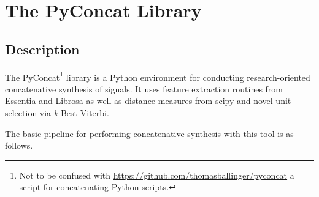 %	
%

\chapter{The PyConcat Library}
\label{app:pyconcat}

\section{Description}

The PyConcat\footnote{Not to be confused with \url{https://github.com/thomasballinger/pyconcat} a script for concatenating Python scripts.} library is a Python environment for conducting research-oriented concatenative synthesis of signals. It uses feature extraction routines from Essentia and Librosa as well as distance measures from scipy and novel unit selection via \textit{k}-Best Viterbi.

The basic pipeline for performing concatenative synthesis with this tool is as follows.

